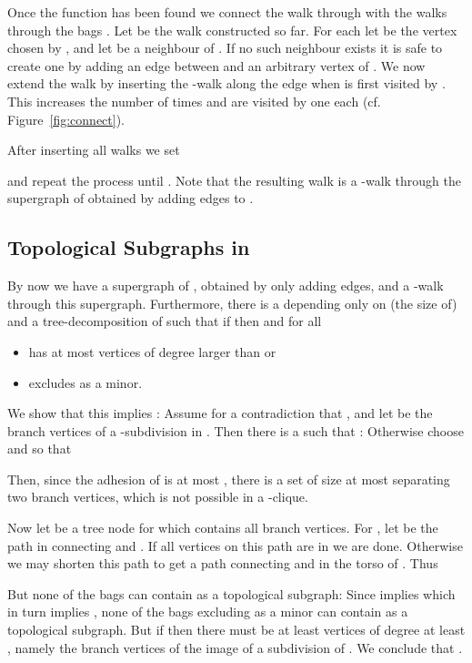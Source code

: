 \documentclass[12pt]{amsart}
\begin{document}
Once the function  has been found we connect the walk  through
 with the walks  through the bags . Let  be the walk constructed so far. For each  let
 be the vertex chosen by , and let  be a neighbour of . If no such
neighbour exists it is safe to create one by adding an edge between
 and an arbitrary vertex of . We now extend the walk  by inserting the -walk
 along the edge  when  is first visited by
. This increases the number of times  and  are visited by
one each (cf. Figure~\ref{fig:connect}).

After inserting all walks  we set

and repeat the process until . Note that the resulting walk
is a -walk through the supergraph  of  obtained by
adding edges to .

\subsection{Topological Subgraphs in }

By now we have a supergraph  of , obtained by only adding
edges, and a -walk  through this
supergraph. Furthermore, there is a  depending only on
(the size of)  and a tree-decomposition  of  such
that if  then  and for
all 
\begin{itemize}
\item  has at most  vertices of degree larger
  than  or
\item  excludes  as a minor.
\end{itemize}

We show that this implies : Assume for a
contradiction that , and let 
be the branch vertices of a -subdivision in . Then there
is a  such that : Otherwise choose  and  so that

Then, since the adhesion of  is at most , there is a
set  of size at most  separating two branch
vertices, which is not possible in a -clique.

Now let  be a tree node for which  contains all
branch vertices. For , let  be the path in 
connecting  and . If all vertices on this path are in
 we are done. Otherwise we may shorten this path to get a path
 connecting  and  in the torso of . Thus


But none of the bags  can contain  as a topological
subgraph: Since  implies  which in turn implies , none of the
bags excluding  as a minor can contain  as a
topological subgraph. But if  then there must
be at least  vertices of degree at least , namely the
branch vertices of the image of a subdivision of . We
conclude that .
\end{document}
